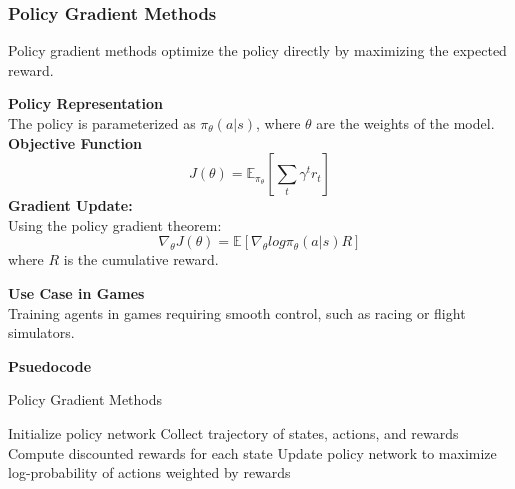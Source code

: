 \documentclass[12pt,oneside,openright,a4paper]{cpe-english-project}
\begin{document}
\subsubsection{Policy Gradient Methods}\cite{PGA}
Policy gradient methods optimize the policy directly by maximizing the expected reward.\par
\textbf{Policy Representation} \\
The policy is parameterized as $\pi_{\theta}(a|s)$, where $\theta$ are the weights of the model. \\
\textbf{Objective Function}
\begin{equation}
J(\theta) = \mathbb{E}_{\pi_{\theta}}[\sum_{t} \gamma^{t}r_{t}]
\end{equation}
\textbf{Gradient Update:} \\
Using the policy gradient theorem:
\begin{equation}
\nabla_{\theta}J(\theta) = \mathbb{E}[\nabla_{\theta}log\pi_{\theta}(a|s)R]
\end{equation}
where $R$ is the cumulative reward.\par
\textbf{Use Case in Games} \\
Training agents in games requiring smooth control, such as racing or flight simulators.\par
\textbf{Psuedocode}
\begin{algorithm}
\caption{Policy Gradient Methods}\label{alg:PGM}
\begin{algorithmic}
\State Initialize policy network
\State Collect trajectory of states, actions, and rewards
\State Compute discounted rewards for each state
\State Update policy network to maximize log-probability of actions weighted by rewards
\EndFor
\end{algorithmic}
\end{algorithm}
\end{document}
